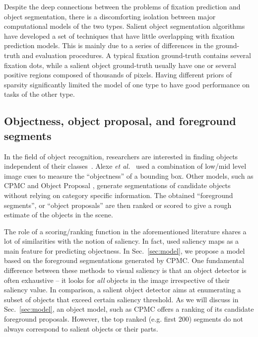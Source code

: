 Despite the deep connections between the problems of fixation prediction and object segmentation, there is a discomforting isolation between major computational models of the two types.  Salient object segmentation algorithms have developed a set of techniques that have little overlapping with fixation prediction models.  This is mainly due to a series of differences in the ground-truth and evaluation procedures.  A typical fixation ground-truth contains several fixation dots, while a salient object ground-truth usually have one or several positive regions composed of thousands of pixels.  Having different priors of sparsity significantly limited the model of one type to have good performance on tasks of the other type.

\subsection{Objectness, object proposal, and foreground segments}\label{sec:reviewObjectness}
In the field of object recognition, researchers are interested in finding objects independent of their classes~\cite{BingObj2014}.  Alexe \emph{et al.}~\cite{alexe2012measuring} used a combination of low/mid level image cues to measure the ``objectness'' of a bounding box.  Other models, such as CPMC \cite{carreira2010constrained,li2010object} and Object Proposal \cite{endres2010category}, generate segmentations of candidate objects without relying on category specific information.  The obtained ``foreground segments'', or ``object proposals'' are then ranked or scored to give a rough estimate of the objects in the scene.

The role of a scoring/ranking function in the aforementioned literature shares a lot of similarities with the notion of saliency.  In fact, \cite{alexe2012measuring} used saliency maps as a main feature for predicting objectness.  In Sec.~\ref{sec:model}, we propose a model based on the foreground segmentations generated by CPMC.  One fundamental difference between these methods to visual saliency is that an object detector is often exhaustive -- it looks for \emph{all} objects in the image irrespective of their saliency value.  In comparison, a salient object detector aims at enumerating a subset of objects that exceed certain saliency threshold.  As we will discuss in Sec.~\ref{sec:model}, an object model, such as CPMC offers a ranking of its candidate foreground proposals.  However, the top ranked (e.g. first 200) segments do not always correspond to salient objects or their parts.


